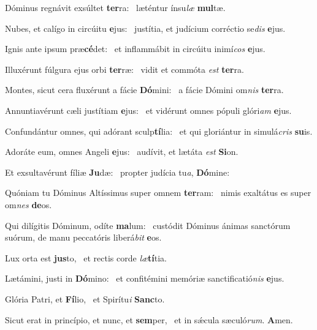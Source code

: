 \item Dóminus regnávit exsúltet \textbf{ter}ra:~\psstar{} læténtur ínsu\textit{læ} \textbf{mul}tæ.
\item Nubes, et calígo in circúitu \textbf{e}jus:~\psstar{} justítia, et judícium corréctio se\textit{dis} \textbf{e}jus.
\item Ignis ante ipsum præ\textbf{cé}det:~\psstar{} et inflammábit in circúitu inimí\textit{cos} \textbf{e}jus.
\item Illuxérunt fúlgura ejus orbi \textbf{ter}ræ:~\psstar{} vidit et commóta \textit{est} \textbf{ter}ra.
\item Montes, sicut cera fluxérunt a fácie \textbf{Dó}mini:~\psstar{} a fácie Dómini om\textit{nis} \textbf{ter}ra.
\item Annuntiavérunt cæli justítiam \textbf{e}jus:~\psstar{} et vidérunt omnes pópuli glóri\textit{am} \textbf{e}jus.
\item Confundántur omnes, qui adórant sculp\textbf{tí}lia:~\psstar{} et qui gloriántur in simulá\textit{cris} \textbf{su}is.
\item Adoráte eum, omnes Angeli \textbf{e}jus:~\psstar{} audívit, et lætáta \textit{est} \textbf{Si}on.
\item Et exsultavérunt fíliæ \textbf{Ju}dæ:~\psstar{} propter judícia tu\textit{a}, \textbf{Dó}mine:
\item Quóniam tu Dóminus Altíssimus super omnem \textbf{ter}ram:~\psstar{} nimis exaltátus es super om\textit{nes} \textbf{de}os.
\item Qui dilígitis Dóminum, odíte \textbf{ma}lum:~\psstar{} custódit Dóminus ánimas sanctórum suórum, de manu peccatóris liberá\textit{bit} \textbf{e}os.
\item Lux orta est \textbf{jus}to,~\psstar{} et rectis corde \textit{læ}\textbf{tí}tia.
\item Lætámini, justi in \textbf{Dó}mino:~\psstar{} et confitémini memóriæ sanctificatió\textit{nis} \textbf{e}jus.
\item Glória Patri, et \textbf{Fí}lio,~\psstar{} et Spirítu\textit{i} \textbf{Sanc}to.
\item Sicut erat in princípio, et nunc, et \textbf{sem}per,~\psstar{} et in sǽcula sæculó\textit{rum}. \textbf{A}men.